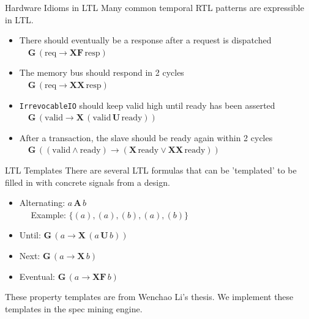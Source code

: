 \documentclass[12pt,aspectratio=169]{beamer}
\begin{document}
\begin{frame}{Hardware Idioms in LTL}
Many common temporal RTL patterns are expressible in LTL.
  \begin{itemize}
    \setlength\itemsep{0.75em}
    \item There should eventually be a response after a request is dispatched \\
      $\quad \mathbf{G}\, (\text{req} \rightarrow \mathbf{XF}\, \text{resp})$
    \item The memory bus should respond in 2 cycles \\
      $\quad \mathbf{G}\, (\text{req} \rightarrow \mathbf{XX}\, \text{resp})$
    \item \texttt{IrrevocableIO} should keep valid high until ready has been asserted \\
      $\quad \mathbf{G}\, (\text{valid} \rightarrow \mathbf{X}\, (\text{valid}\, \mathbf{U}\, \text{ready}))$
    \item After a transaction, the slave should be ready again within 2 cycles \\
      $\quad \mathbf{G}\, ((\text{valid} \land \text{ready}) \rightarrow (\mathbf{X}\, \text{ready} \lor \mathbf{XX}\, \text{ready}))$
  \end{itemize}
\end{frame}

\begin{frame}{LTL Templates}
There are several LTL formulas that can be 'templated' to be filled in with concrete signals from a design.
  \begin{itemize}
    \item Alternating: $a\, \mathbf{A}\, b$ \\
      $\quad$ Example: $\{(a), (a), (b), (a), (b)\}$
    \item Until: $\mathbf{G}\, (a \rightarrow \mathbf{X}\, (a\, \mathbf{U}\, b))$
    \item Next: $\mathbf{G}\, (a \rightarrow \mathbf{X}\, b)$
    \item Eventual: $\mathbf{G}\, (a \rightarrow \mathbf{X F}\, b)$
  \end{itemize}
These property templates are from Wenchao Li's thesis. We implement these templates in the spec mining engine.
\end{frame}
\end{document}
